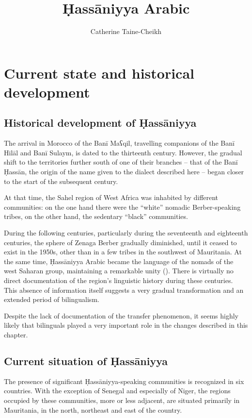 \documentclass[output=paper]{langsci/langscibook}
\author{Catherine Taine-Cheikh\affiliation{CNRS, Lacito}}
\title{Ḥassāniyya Arabic}
\begin{document}
\maketitle 
 

\section{Current state and historical development}

\subsection{Historical development of Ḥassāniyya} %

The arrival in Morocco of the Banī Maʕqil, travelling companions of the Banī Hilāl and Banī Sulaym, is dated to the thirteenth century. However, the gradual shift to the territories further south of one of their branches – that of the Banī Ḥassān, the origin of the name given to the dialect described here – began closer to the start of the subsequent century. 

At that time, the Sahel region of West Africa was inhabited by different communities: on the one hand there were the “white” nomadic Berber-speaking tribes, on the other hand, the sedentary “black” communities.

During the following centuries, particularly during the seventeenth and eighteenth centuries, the sphere of Zenaga Berber gradually diminished, until it ceased to exist in the 1950s, other than in a few tribes in the southwest of Mauritania. At the same time, Ḥassāniyya Arabic became the language of the nomads of the west Saharan group, maintaining a remarkable unity (\citealt{Taine-Cheikh2016,Taine-Cheikh2018historical}). There is virtually no direct documentation of the region’s linguistic history during these centuries. This absence of information itself suggests a very gradual transformation and an extended period of bilingualism.

Despite the lack of documentation of the transfer phenomenon, it seems highly likely that bilinguals played a very important role in the changes described in this chapter. 

\subsection{Current situation of Ḥassāniyya} %

The presence of significant Ḥassāniyya-speaking communities is recognized in six countries. With the exception of Senegal and especially of Niger, the regions occupied by these communities, more or less adjacent, are situated primarily in Mauritania, in the north, northeast and east of the country. 
\end{document}
